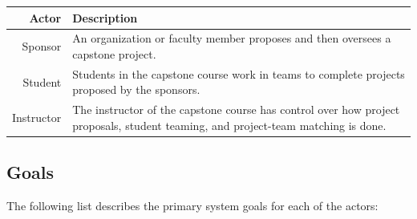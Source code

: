 \documentclass[12pt]{article}
\begin{document}
\begin{center}
\begin{tabularx}{\linewidth}{ |r|X| }
	\hline
	\textbf{Actor} & \textbf{Description} \\
	\hline\hline
	Sponsor & An organization or faculty member proposes and then oversees a capstone project. \\
	\hline
	Student & Students in the capstone course work in teams to complete projects proposed by the sponsors. \\
	\hline
	Instructor & The instructor of the capstone course has control over how project proposals, student teaming, and project-team matching is done. \\
	\hline
\end{tabularx}
\end{center}

\subsection{Goals}

The following list describes the primary system goals for each of the actors:
\end{document}
